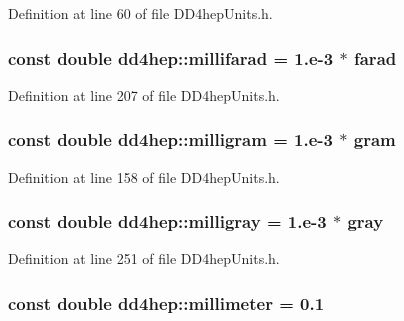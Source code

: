Definition at line 60 of file DD4hepUnits.h.\hypertarget{namespacedd4hep_ab6b260f94b42644b41c2d1e8618ae238}{
\subsubsection[{millifarad}]{\setlength{\rightskip}{0pt plus 5cm}const double {\bf dd4hep::millifarad} = 1.e-\/3 $\ast$ {\bf farad}}}
\label{namespacedd4hep_ab6b260f94b42644b41c2d1e8618ae238}


Definition at line 207 of file DD4hepUnits.h.\hypertarget{namespacedd4hep_ad2ffff3db78948c1ad083f3f41b26acb}{
\subsubsection[{milligram}]{\setlength{\rightskip}{0pt plus 5cm}const double {\bf dd4hep::milligram} = 1.e-\/3 $\ast$ {\bf gram}}}
\label{namespacedd4hep_ad2ffff3db78948c1ad083f3f41b26acb}


Definition at line 158 of file DD4hepUnits.h.\hypertarget{namespacedd4hep_abc834abd0eb01594746cfdfd7b91104d}{
\subsubsection[{milligray}]{\setlength{\rightskip}{0pt plus 5cm}const double {\bf dd4hep::milligray} = 1.e-\/3 $\ast$ {\bf gray}}}
\label{namespacedd4hep_abc834abd0eb01594746cfdfd7b91104d}


Definition at line 251 of file DD4hepUnits.h.\hypertarget{namespacedd4hep_a1b3044c28560621f033b6f0fb9a15854}{
\subsubsection[{millimeter}]{\setlength{\rightskip}{0pt plus 5cm}const double {\bf dd4hep::millimeter} = 0.1}}
\label{namespacedd4hep_a1b3044c28560621f033b6f0fb9a15854}


